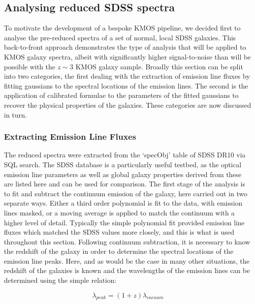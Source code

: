 \documentclass{literature}
\begin{document}
\subsection{Analysing reduced SDSS spectra}\label{subsec:sdss_spec}
To motivate the development of a bespoke KMOS pipeline, we decided first to analyse the pre-reduced spectra of a set of normal, local SDSS galaxies. This back-to-front approach demonstrates the type of analysis that will be applied to KMOS galaxy spectra, albeit with significantly higher signal-to-noise than will be possible with the $z\sim 3$ KMOS galaxy sample. 
Broadly this section can be split into two categories, the first dealing with the extraction of emission line fluxes by fitting gaussians to the spectral locations of the emission lines. The second is the application of calibrated formulae to the parameters of the fitted gaussians to recover the physical properties of the galaxies. These categories are now discussed in turn.  

\subsubsection{Extracting Emission Line Fluxes}\label{subsub:ex_em}   
The reduced spectra were extracted from the `specObj' table of SDSS DR10 via SQL search. The SDSS database is a particularly useful testbed, as the optical emission line parameters as well as global galaxy properties derived from these are listed here and can be used for comparison.  The first stage of the analysis is to fit and subtract the continuum emission of the galaxy, here carried out in two separate ways. Either a third order polynomial is fit to the data, with emission lines masked, or a moving average is applied to match the continuum with a higher level of detail. Typically the simple polynomial fit provided emission line fluxes which matched the SDSS values more closely, and this is what is used throughout this section. Following continuum subtraction, it is necessary to know the redshift of the galaxy in order to determine the spectral locations of the emission line peaks. Here, and as would be the case in many other situations, the redshift of the galaxies is known and the wavelengths of the emission lines can be determined using the simple relation: 

\begin{equation}
\label{eq:redshift}
	\lambda _{peak} = (1 + z)\lambda _{vacuum}
\end{equation}
\end{document}
